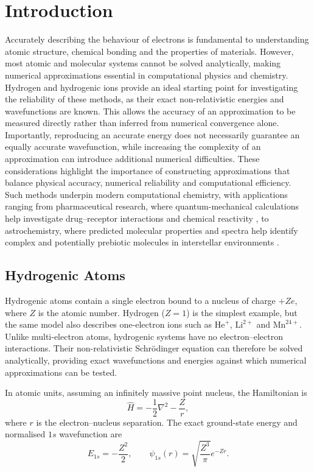 \chapter{Introduction}
\label{chap:introduction}



Accurately describing the behaviour of electrons is fundamental to understanding atomic structure, chemical bonding and the properties of materials. However, most atomic and molecular systems cannot be solved analytically, making numerical approximations essential in computational physics and chemistry. Hydrogen and hydrogenic ions provide an ideal starting point for investigating the reliability of these methods, as their exact non-relativistic energies and wavefunctions are known. This allows the accuracy of an approximation to be measured directly rather than inferred from numerical convergence alone. Importantly, reproducing an accurate energy does not necessarily guarantee an equally accurate wavefunction, while increasing the complexity of an approximation can introduce additional numerical difficulties. These considerations highlight the importance of constructing approximations that balance physical accuracy, numerical reliability and computational efficiency. Such methods underpin modern computational chemistry, with applications ranging from pharmaceutical research, where quantum-mechanical calculations help investigate drug–receptor interactions and chemical reactivity \cite{heifetz2020}, to astrochemistry, where predicted molecular properties and spectra help identify complex and potentially prebiotic molecules in interstellar environments \cite{barone2015}.
\section{Hydrogenic Atoms}

Hydrogenic atoms contain a single electron bound to a
nucleus of charge $+Ze$, where $Z$ is the atomic number.
Hydrogen ($Z=1$) is the simplest example, but the same
model also describes one-electron ions such as
$\mathrm{He}^{+}$, $\mathrm{Li}^{2+}$ and
$\mathrm{Mn}^{24+}$. Unlike multi-electron atoms, hydrogenic systems have no electron--electron interactions. Their non-relativistic Schrödinger equation can therefore be solved analytically, providing exact wavefunctions and energies against which numerical approximations can be tested.

In atomic units, assuming an infinitely massive point
nucleus, the Hamiltonian is
\begin{equation}
    \hat{H}=-\frac{1}{2}\nabla^2-\frac{Z}{r},
    \label{eq:intro_hamiltonian}
\end{equation}
where $r$ is the electron--nucleus separation.
The exact ground-state energy and normalised
$1s$ wavefunction are
\begin{equation}
    E_{1s}=-\frac{Z^2}{2},
    \qquad
    \psi_{1s}(r)
    =\sqrt{\frac{Z^3}{\pi}}e^{-Zr}.
    \label{eq:intro_hydrogenic}
\end{equation}

